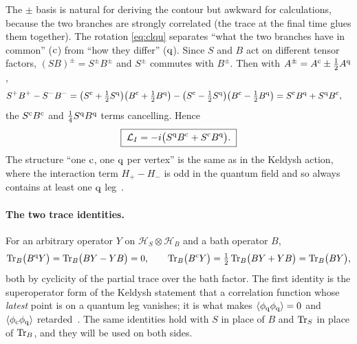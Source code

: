 The $\pm$ basis is natural for deriving the contour but awkward for calculations, because the two branches are strongly correlated (the trace at the final time glues them together).
The rotation \cref{eq:clqu} separates ``what the two branches have in common'' ($\mathrm{c}$) from ``how they differ'' ($\mathrm{q}$).
Since $S$ and $B$ act on different tensor factors, $(SB)^\pm=S^\pm B^\pm$ and $S^\pm$ commutes with $B^\pm$.
Then with $A^\pm=A^{\mathrm{c}}\pm\tfrac12A^{\mathrm{q}}$,
\begin{align}
  S^{+}B^{+}-S^{-}B^{-}
  &=\big(S^{\mathrm{c}}+\tfrac12S^{\mathrm{q}}\big)\big(B^{\mathrm{c}}+\tfrac12B^{\mathrm{q}}\big)
   -\big(S^{\mathrm{c}}-\tfrac12S^{\mathrm{q}}\big)\big(B^{\mathrm{c}}-\tfrac12B^{\mathrm{q}}\big)
  =S^{\mathrm{c}} B^{\mathrm{q}}+S^{\mathrm{q}} B^{\mathrm{c}} ,
\end{align}
the $S^{\mathrm{c}} B^{\mathrm{c}}$ and $\frac14S^{\mathrm{q}} B^{\mathrm{q}}$ terms cancelling.
Hence
\begin{equation}
  \boxed{\;\mathcal{L}_I=-i\big(S^{\mathrm{q}}B^{\mathrm{c}}+S^{\mathrm{c}}B^{\mathrm{q}}\big).\;}
  \label{eq:LIcq}
\end{equation}
The structure ``one $\mathrm{c}$, one $\mathrm{q}$ per vertex'' is the same as in the Keldysh action, where the interaction term $H_+-H_-$ is odd in the quantum field and so always contains at least one $\mathrm{q}$ leg~\cite[Sec.~2.7]{Kamenev2011}.

\paragraph{The two trace identities.}
For an arbitrary operator $Y$ on $\mathcal H_S\otimes\mathcal H_B$ and a bath operator $B$,
\begin{equation}
  \operatorname{Tr}_B\!\big(B^{\mathrm{q}} Y\big)=\operatorname{Tr}_B\!\big(BY-YB\big)=0,\qquad
  \operatorname{Tr}_B\!\big(B^{\mathrm{c}} Y\big)=\tfrac12\operatorname{Tr}_B\!\big(BY+YB\big)=\operatorname{Tr}_B\!\big(BY\big),
  \label{eq:trace-identities}
\end{equation}
both by cyclicity of the partial trace over the bath factor.
The first identity is the superoperator form of the Keldysh statement that a correlation function whose \emph{latest} point is on a quantum leg vanishes; it is what makes $\langle\phi_{\mathrm{q}}\phi_{\mathrm{q}}\rangle=0$ and $\langle\phi_{\mathrm{c}}\phi_{\mathrm{q}}\rangle$ retarded~\cite[Sec.~2.6]{Kamenev2011}.
The same identities hold with $S$ in place of $B$ and $\operatorname{Tr}_S$ in place of $\operatorname{Tr}_B$, and they will be used on both sides.


